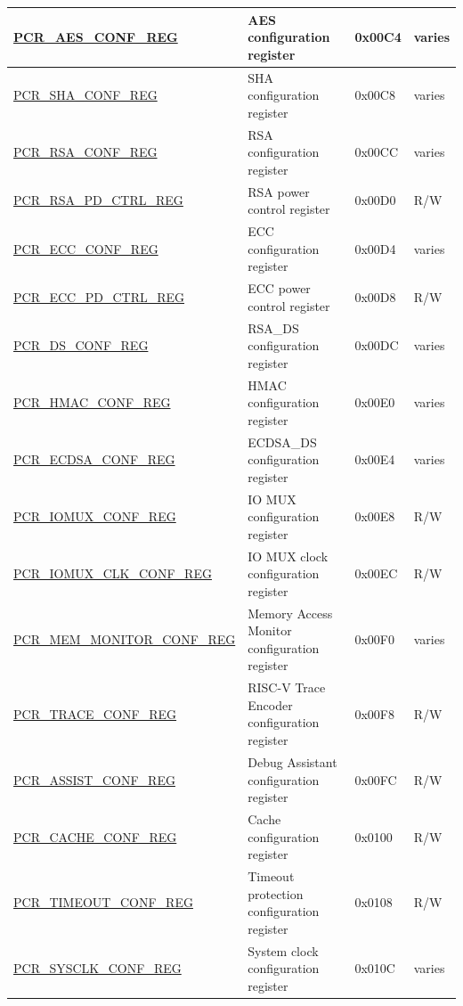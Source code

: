 \begin{longtable}{ | p{7.2cm} | p{6cm} | p{1.3cm} | p{1cm} | }
\hyperref[regdesc:PCRAESCONFREG]{PCR\_AES\_CONF\_REG} & AES configuration register & 0x00C4 & varies \\ \hline
\hyperref[regdesc:PCRSHACONFREG]{PCR\_SHA\_CONF\_REG} & SHA configuration register & 0x00C8 & varies \\ \hline
\hyperref[regdesc:PCRRSACONFREG]{PCR\_RSA\_CONF\_REG} & RSA configuration register & 0x00CC & varies \\ \hline
\hyperref[regdesc:PCRRSAPDCTRLREG]{PCR\_RSA\_PD\_CTRL\_REG} & RSA power control register & 0x00D0 & R/W \\ \hline
\hyperref[regdesc:PCRECCCONFREG]{PCR\_ECC\_CONF\_REG} & ECC configuration register & 0x00D4 & varies \\ \hline
\hyperref[regdesc:PCRECCPDCTRLREG]{PCR\_ECC\_PD\_CTRL\_REG} & ECC power control register & 0x00D8 & R/W \\ \hline
\hyperref[regdesc:PCRDSCONFREG]{PCR\_DS\_CONF\_REG} & RSA\_DS configuration register & 0x00DC & varies \\ \hline
\hyperref[regdesc:PCRHMACCONFREG]{PCR\_HMAC\_CONF\_REG} & HMAC configuration register & 0x00E0 & varies \\ \hline
\hyperref[regdesc:PCRECDSACONFREG]{PCR\_ECDSA\_CONF\_REG} & ECDSA\_DS configuration register & 0x00E4 & varies \\ \hline
\hyperref[regdesc:PCRIOMUXCONFREG]{PCR\_IOMUX\_CONF\_REG} & IO MUX configuration register & 0x00E8 & R/W \\ \hline
\hyperref[regdesc:PCRIOMUXCLKCONFREG]{PCR\_IOMUX\_CLK\_CONF\_REG} & IO MUX clock configuration register & 0x00EC & R/W \\ \hline
\hyperref[regdesc:PCRMEMMONITORCONFREG]{PCR\_MEM\_MONITOR\_CONF\_REG} & Memory Access Monitor configuration register & 0x00F0 & varies \\ \hline
\hyperref[regdesc:PCRTRACECONFREG]{PCR\_TRACE\_CONF\_REG} & RISC-V Trace Encoder configuration register & 0x00F8 & R/W \\ \hline
\hyperref[regdesc:PCRASSISTCONFREG]{PCR\_ASSIST\_CONF\_REG} & Debug Assistant configuration register & 0x00FC & R/W \\ \hline
\hyperref[regdesc:PCRCACHECONFREG]{PCR\_CACHE\_CONF\_REG} & Cache configuration register & 0x0100 & R/W \\ \hline
\hyperref[regdesc:PCRTIMEOUTCONFREG]{PCR\_TIMEOUT\_CONF\_REG} & Timeout protection configuration register & 0x0108 & R/W \\ \hline
\hyperref[regdesc:PCRSYSCLKCONFREG]{PCR\_SYSCLK\_CONF\_REG} & System clock configuration register & 0x010C & varies \\ \hline

\end{longtable}
